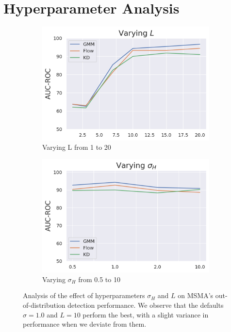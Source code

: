 


\section{Hyperparameter Analysis}
\label{hyperparams}

\begin{figure}[tbhp]

\centering
\begin{subfigure}[b]{0.45\textwidth}
\includegraphics[scale=0.5]{figures/L_analysis.png}
\caption{Varying L from 1 to 20}
\label{fig:L_analysis}
\end{subfigure}
\begin{subfigure}[b]{0.45\textwidth}
    \includegraphics[scale=0.5]{figures/sigma_analysis.png}
    \caption{Varying $\sigma_H$ from 0.5 to 10}
    \label{fig:sigma_analysis}
\end{subfigure}
\caption{Analysis of the effect of hyperparameters $\sigma_H$ and $L$ on MSMA's out-of-distribution detection performance. We observe that the defaults $\sigma=1.0$ and $L=10$ perform the best, with a slight variance in performance when we deviate from them.}
\label{fig:analysis}
\end{figure}


